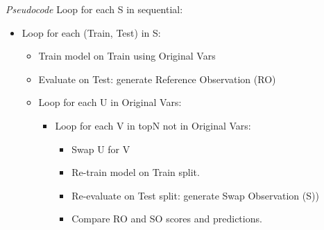 \emph{Pseudocode}
Loop for each S in sequential:
\begin{itemize}
    \item Loop for each (Train, Test) in S:
    \begin{itemize}
        \item Train model on Train using Original Vars
        \item Evaluate on Test: generate Reference Observation (RO)
        \item Loop for each U in Original Vars:
        \begin{itemize}
            \item Loop for each V in topN not in Original Vars:
            \begin{itemize}
                \item Swap U for V
                \item Re-train model on Train split.
                \item Re-evaluate on Test split: generate Swap Observation (S))
                \item Compare RO and SO scores and predictions.
            \end{itemize}
        \end{itemize}
    \end{itemize}
\end{itemize}




